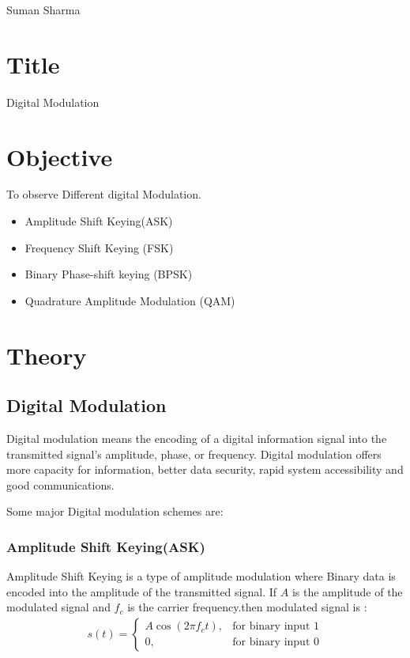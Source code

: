 \documentclass[a4paper,11pt]{article}
\begin{document}
{Suman Sharma}

\renewcommand{\contentsname}{Table of Contents}
\tableofcontents

\pagebreak
\lstlistoflistings
\vspace{10em}
\listoffigures
\pagebreak
{}

\section{Title} {\large Digital Modulation }
\section{Objective}
To observe Different digital Modulation.
\begin{itemize}
    \item Amplitude Shift Keying(ASK)
    \item Frequency Shift Keying (FSK)
    \item Binary Phase-shift keying (BPSK)
    \item Quadrature Amplitude Modulation (QAM)
\end{itemize}



\section{Theory}
\subsection{Digital Modulation}
Digital modulation means the encoding of a digital information signal into the transmitted signal's amplitude, phase, or frequency. Digital modulation offers more capacity for information, better data security, rapid system accessibility and good communications.

Some major Digital modulation schemes are:

\subsubsection{Amplitude Shift Keying(ASK)}
Amplitude Shift Keying is a type of amplitude modulation where Binary data is encoded into the amplitude of the transmitted signal. If $A$ is the amplitude of the modulated signal and $f_c$ is the carrier frequency.then modulated signal is :
\begin{align*}
    s(t) =
    \begin{cases}
        A\cos{(2\pi f_c t)}, & \text{for binary input 1} \\
        0,                   & \text{for binary input 0}
    \end{cases}
\end{align*}
\end{document}
